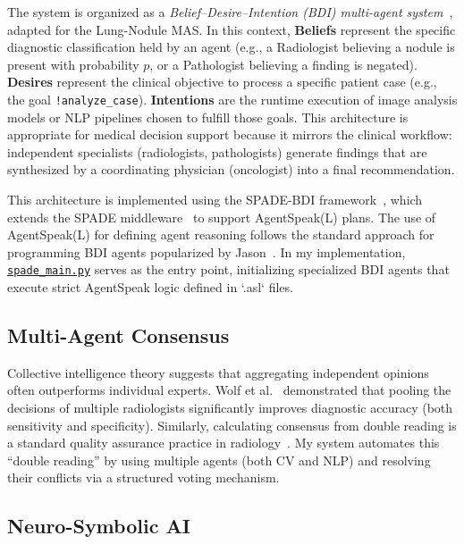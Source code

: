 \documentclass[12pt]{article}
\begin{document}
The system is organized as a \emph{Belief--Desire--Intention (BDI) multi-agent system}~\cite{rao1995bdi}, adapted for the Lung-Nodule MAS. In this context, \textbf{Beliefs} represent the specific diagnostic classification held by an agent (e.g., a Radiologist believing a nodule is present with probability $p$, or a Pathologist believing a finding is negated). \textbf{Desires} represent the clinical objective to process a specific patient case (e.g., the goal \texttt{!analyze\_case}). \textbf{Intentions} are the runtime execution of image analysis models or NLP pipelines chosen to fulfill those goals. This architecture is appropriate for medical decision support because it mirrors the clinical workflow: independent specialists (radiologists, pathologists) generate findings that are synthesized by a coordinating physician (oncologist) into a final recommendation.

This architecture is implemented using the SPADE-BDI framework~\cite{spadebdi_docs}, which extends the SPADE middleware~\cite{palanca2020spade} to support AgentSpeak(L) plans. The use of AgentSpeak(L) for defining agent reasoning follows the standard approach for programming BDI agents popularized by Jason~\cite{bordini2009multiagentprogramming}. In my implementation, \href{https://github.com/sepehrkdi/lung_nodule_mas/blob/main/spade_main.py}{\texttt{spade\_main.py}} serves as the entry point, initializing specialized BDI agents that execute strict AgentSpeak logic defined in `.asl` files.

\subsection{Multi-Agent Consensus}
\label{subsec:consensus-bg}

Collective intelligence theory suggests that aggregating independent opinions often outperforms individual experts. Wolf et al.~\cite{wolf2015collective} demonstrated that pooling the decisions of multiple radiologists significantly improves diagnostic accuracy (both sensitivity and specificity). Similarly, calculating consensus from double reading is a standard quality assurance practice in radiology~\cite{schaefer2018double}. My system automates this ``double reading'' by using multiple agents (both CV and NLP) and resolving their conflicts via a structured voting mechanism.

\subsection{Neuro-Symbolic AI}
\label{subsec:neurosymbolic-bg}
\end{document}
